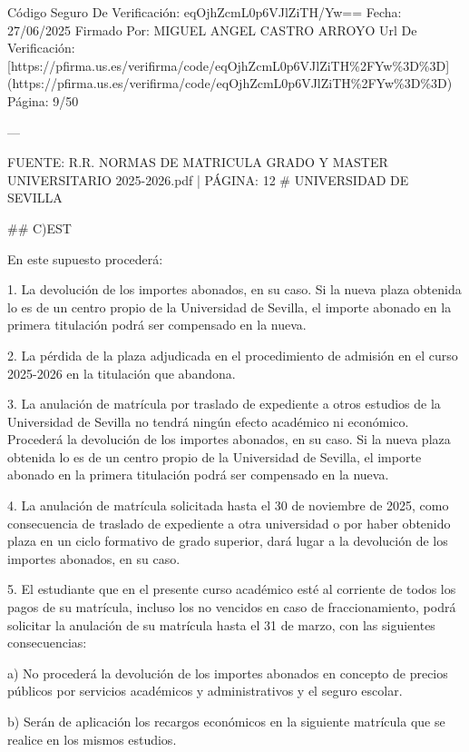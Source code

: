 \documentclass{article}
\begin{document}
\begin{itemize}
\begin{itemize}
\begin{scriptsize}
                  Código Seguro De Verificación: eqOjhZcmL0p6VJlZiTH/Yw==
                  Fecha: 27/06/2025
                  Firmado Por: MIGUEL ANGEL CASTRO ARROYO
                  Url De Verificación: [https://pfirma.us.es/verifirma/code/eqOjhZcmL0p6VJlZiTH\%2FYw\%3D\%3D](https://pfirma.us.es/verifirma/code/eqOjhZcmL0p6VJlZiTH\%2FYw\%3D\%3D)
                  Página: 9/50

                  ---

                  FUENTE: R.R. NORMAS DE MATRICULA GRADO Y MASTER UNIVERSITARIO 2025-2026.pdf | PÁGINA: 12
                  \# UNIVERSIDAD DE SEVILLA

                  \#\# C)EST

                  En este supuesto procederá:

                  1. La devolución de los importes abonados, en su caso. Si la nueva plaza obtenida lo es de un centro propio de la Universidad de Sevilla, el importe abonado en la primera titulación podrá ser compensado en la nueva.

                  2. La pérdida de la plaza adjudicada en el procedimiento de admisión en el curso 2025-2026 en la titulación que abandona.

                  3. La anulación de matrícula por traslado de expediente a otros estudios de la Universidad de Sevilla no tendrá ningún efecto académico ni económico. Procederá la devolución de los importes abonados, en su caso. Si la nueva plaza obtenida lo es de un centro propio de la Universidad de Sevilla, el importe abonado en la primera titulación podrá ser compensado en la nueva.

                  4. La anulación de matrícula solicitada hasta el 30 de noviembre de 2025, como consecuencia de traslado de expediente a otra universidad o por haber obtenido plaza en un ciclo formativo de grado superior, dará lugar a la devolución de los importes abonados, en su caso.

                  5. El estudiante que en el presente curso académico esté al corriente de todos los pagos de su matrícula, incluso los no vencidos en caso de fraccionamiento, podrá solicitar la anulación de su matrícula hasta el 31 de marzo, con las siguientes consecuencias:

                  a) No procederá la devolución de los importes abonados en concepto de precios públicos por servicios académicos y administrativos y el seguro escolar.

                  b) Serán de aplicación los recargos económicos en la siguiente matrícula que se realice en los mismos estudios.


\end{scriptsize}
\end{itemize}
\end{itemize}
\end{document}
